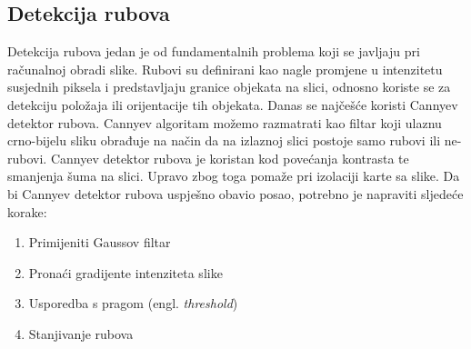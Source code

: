\documentclass[times, zavrsni, numeric, utf8]{fer}
\begin{document}
\subsection{Detekcija rubova}
\label{schap:edgedetect}
\hspace*{0.5cm}Detekcija rubova jedan je od fundamentalnih problema koji se javljaju pri računalnoj obradi slike. Rubovi su definirani kao nagle promjene u intenzitetu susjednih piksela i predstavljaju granice objekata na slici, odnosno koriste se za detekciju položaja ili orijentacije tih objekata. Danas se najčešće koristi Cannyev detektor rubova\cite{canny1986comp}. Cannyev algoritam možemo razmatrati kao filtar koji ulaznu crno-bijelu sliku obrađuje na način da na izlaznoj slici postoje samo rubovi ili ne-rubovi. Cannyev detektor rubova je koristan kod povećanja kontrasta te smanjenja šuma na slici. Upravo zbog toga pomaže pri izolaciji karte sa slike. Da bi Cannyev detektor rubova uspješno obavio posao, potrebno je napraviti sljedeće korake: 
\begin{enumerate}
\item Primijeniti Gaussov filtar\cite{wikigauss} 
\item Pronaći gradijente intenziteta slike 
\item Usporedba s pragom (engl. \textit{threshold}) 
\item Stanjivanje rubova 
\end{enumerate}
\end{document}
